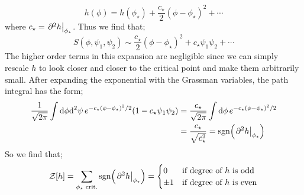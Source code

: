 \begin{equation*}
h(\phi) = h(\phi_\star) + \frac{c_\star}{2}(\phi - \phi_\star)^2 + \cdots
\end{equation*}
where $c_\star = \left.\del^2 h\right|_{\phi_\star}$. Thus we find that;
\begin{equation*}
S(\phi, \psi_1, \psi_2) \sim \frac{c_\star}{2}(\phi - \phi_\star)^2 + c_\star \psi_1 \psi_2 + \cdots
\end{equation*}
The higher order terms in this expansion are negligible since we can simply rescale $h$ to look closer and closer to the critical point and make them arbitrarily small. After expanding the exponential with the Grassman variables, the path integral has the form;
\begin{align*}
\frac{1}{\sqrt{2\pi}}\int{\ud \phi \upd{^2 \psi}e^{-c_\star(\phi - \phi_\star)^2/2}(1 - c_\star\psi_1 \psi_2)} &= \frac{c_\star}{\sqrt{2\pi}}\int{\upd{\phi}e^{-c_\star(\phi - \phi_\star)^2/2}} \\
&= \frac{c_\star}{\sqrt{c_\star^2}} = \text{sgn}\left(\left.\del^2 h\right|_{\phi_\star}\right)
\end{align*}
So we find that;
\begin{equation}
\mZ[h] = \sum_{\phi_\star \,\,\text{crit.}}{\text{sgn}\left(\left.\del^2 h\right|_{\phi_\star}\right)} = \begin{cases}0&\text{if degree of }h\text{ is odd}\\ \pm1&\text{if degree of }h\text{ is even}\end{cases}
\end{equation}
\newpage
